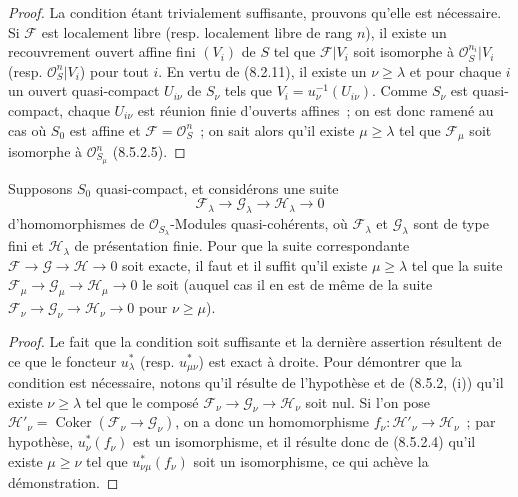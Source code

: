 \begin{proof}
La condition étant trivialement suffisante, prouvons qu'elle est nécessaire.
Si $\mathcal F$ est localement libre (resp. localement libre de rang $n$), il
existe un recouvrement ouvert affine fini $(V_i)$ de $S$ tel que
$\mathcal F|V_i$ soit isomorphe à $\mathcal O_S^{n_i}|V_i$ (resp.
$\mathcal O_S^n|V_i$) pour tout $i$. En vertu de (8.2.11), il existe un
$\nu\geq\lambda$ et pour chaque $i$ un ouvert quasi-compact $U_{i\nu}$ de
$S_\nu$ tels que $V_i=u_\nu^{-1}(U_{i\nu})$. Comme $S_\nu$ est quasi-compact,
chaque $U_{i\nu}$ est réunion finie d'ouverts affines~; on est donc ramené au
cas où $S_0$ est affine et $\mathcal F=\mathcal O_S^n$~; on sait alors qu'il
existe $\mu\geq\lambda$ tel que $\mathcal F_\mu$ soit isomorphe à
$\mathcal O_{S_\mu}^n$ (8.5.2.5).
\end{proof}

\begin{proposition}[8.5.6]
\label{IV.8.5.6-fr}
Supposons $S_0$ quasi-compact, et considérons une suite
\[
  \mathcal F_\lambda\longrightarrow\mathcal G_\lambda
  \longrightarrow\mathcal H_\lambda\longrightarrow0
\]
d'homomorphismes de $\mathcal O_{S_\lambda}$-Modules quasi-cohérents, où
$\mathcal F_\lambda$ et $\mathcal G_\lambda$ sont de type fini et
$\mathcal H_\lambda$ de présentation finie. Pour que la suite correspondante
$\mathcal F\to\mathcal G\to\mathcal H\to0$ soit exacte, il faut et il suffit
qu'il existe $\mu\geq\lambda$ tel que la suite
$\mathcal F_\mu\to\mathcal G_\mu\to\mathcal H_\mu\to0$ le soit (auquel cas il
en est de même de la suite
$\mathcal F_\nu\to\mathcal G_\nu\to\mathcal H_\nu\to0$ pour
$\nu\geq\mu$).
\end{proposition}

\begin{proof}
Le fait que la condition soit suffisante et la dernière assertion résultent
de ce que le foncteur $u_\lambda^*$ (resp. $u_{\mu\nu}^*$) est exact à droite.
Pour démontrer que la condition est nécessaire, notons qu'il résulte de
l'hypothèse et de (8.5.2, (i)) qu'il existe $\nu\geq\lambda$ tel que le composé
$\mathcal F_\nu\to\mathcal G_\nu\to\mathcal H_\nu$ soit nul. Si l'on pose
$\mathcal H'_\nu=\operatorname{Coker}(\mathcal F_\nu\to\mathcal G_\nu)$, on a
donc un homomorphisme $f_\nu:\mathcal H'_\nu\to\mathcal H_\nu$~; par
hypothèse, $u_\nu^*(f_\nu)$ est un isomorphisme, et il résulte donc de
(8.5.2.4) qu'il existe $\mu\geq\nu$ tel que $u_{\nu\mu}^*(f_\nu)$ soit un
isomorphisme, ce qui achève la démonstration.
\end{proof}

